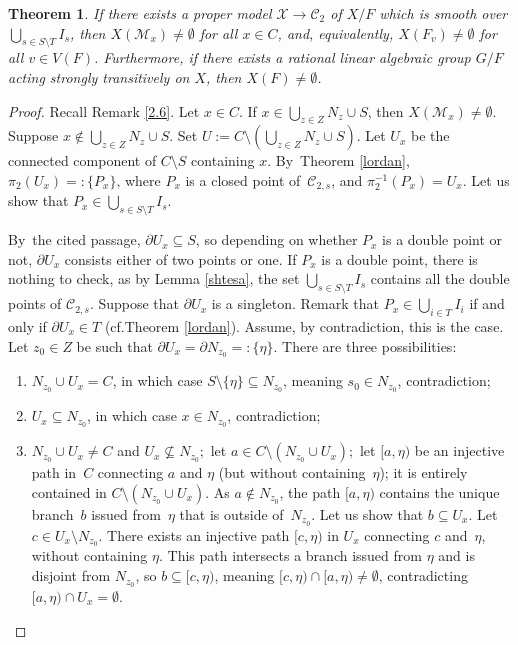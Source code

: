 \documentclass[10pt]{amsart}
\newcommand{\cf}{cf.}
\newcommand{\loccit}{the cited passage}
\let\backslash\setminus
\newtheorem{thm}{Theorem}[section]
\theoremstyle{definition}
\begin{document}
\begin{thm} \label{2.13}
If there exists a proper model $\mathcal{X} \to \mathscr{C}_2$ of $X/F$ which is smooth over $\bigcup_{s \in S \backslash T} I_s$, then $X(\mathscr{M}_x) \neq \emptyset$ for all $x \in C$, and, equivalently, $X(F_v) \neq \emptyset$ for all ${v \in V(F)}$.
Furthermore, if there exists a rational linear algebraic group $G/F$ acting strongly transitively on $X$, then $X(F) \neq \emptyset$.
\end{thm}

\begin{proof} Recall Remark \ref{2.6}.
Let $x \in C$. If $x \in \bigcup_{z \in Z}N_z \cup S$, then $X(\mathscr{M}_x) \neq \emptyset$. Suppose $x \not \in \bigcup_{z \in Z}N_z \cup S$. Set $U:=C \backslash (\bigcup_{z \in Z} N_z \cup S)$. Let $U_x$ be the connected component of $C \backslash S$ containing $x$. By~Theorem \ref{lordan}, $\pi_2(U_x)=:\{P_x\}$, where $P_x$ is a closed point of~$\mathscr{C}_{2,s}$, and ${\pi_2^{-1}(P_x)=U_x}$. Let us show that $P_x \in \bigcup_{s \in S\backslash T} I_s$.

By~\loccit, $\partial{U_x} \subseteq S$, so depending on whether $P_x$ is a double point or not, $\partial{U_x}$ consists either of two points or one.
If $P_x$ is a double point, there is nothing to check, as by Lemma \ref{shtesa}, the set $\bigcup_{s \in S \backslash T} I_s$ contains all the double points of $\mathscr{C}_{2,s}$.
Suppose that $\partial{U_x}$ is a singleton. Remark that $P_x \in \bigcup_{i \in T} I_i$ if and only if $\partial{U_x} \in T$ (\cf Theorem \ref{lordan}). Assume, by contradiction, this is the case. Let $z_0 \in Z$ be such that $\partial{U_x}=\partial{N_{z_0}}=:\{\eta\}$. There are three possibilities:

\begin{enumerate}
\item
$N_{z_0} \cup U_x=C$, in which case $S \backslash \{\eta\} \subseteq N_{z_0}$, meaning $s_0 \in N_{z_0}$, contradiction;

\item
$U_x \subseteq N_{z_0}$, in which case $x \in N_{z_0}$, contradiction;

\item
$N_{z_0} \cup U_x\neq C$ and $U_x \not \subseteq N_{z_0};$ let $a \in C \backslash (N_{z_0} \cup U_x);$ let $[a, \eta)$ be an injective path in~$C$ connecting $a$ and $\eta$ (but without containing~$\eta$); it is entirely contained in $C \backslash (N_{z_0} \cup U_x)$.
As $a \not \in N_{z_0}$, the path $[a,\eta)$ contains the unique branch~$b$ issued from~$\eta$ that is outside of~$N_{z_0}$. Let us show that $b \subseteq U_x$. Let $c \in U_x \backslash N_{z_0}$. There exists an injective path $[c, \eta)$ in $U_x$ connecting $c$ and~$\eta$, without containing $\eta$. This path intersects a branch issued from $\eta$ and is disjoint from $N_{z_0}$, so $b \subseteq [c, \eta)$, meaning $[c, \eta) \cap [a, \eta) \neq \emptyset$, contradicting $[a, \eta) \cap U_x=\emptyset$.
\end{enumerate}


\end{proof}
\end{document}
